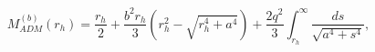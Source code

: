 \begin{equation}
M^{(b)}_{ADM}(r_h)= \frac{r_h}{2}+\frac{b^2
r_h}{3}(r_{h}^2-\sqrt{r_{h}^4+a^4})+\frac{2q^2}{3}
\int^{\infty}_{r_h}{\frac{ds}{\sqrt{a^4+s^4}}},
\label{Madm}
\end{equation}

